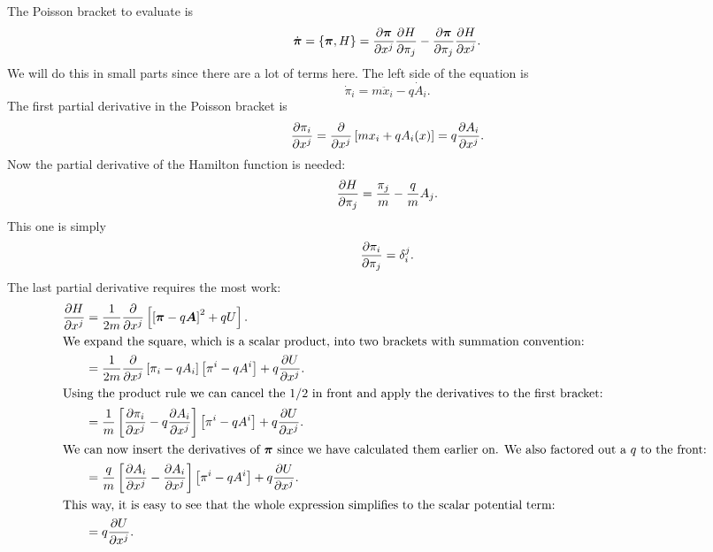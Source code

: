 \documentclass[11pt, english, fleqn, DIV=15, headinclude, BCOR=1cm]{scrartcl}
\begin{document}
The Poisson bracket to evaluate is
\[
    \dot{\boldsymbol{\pi}} = \{\boldsymbol{\pi}, H\} = \frac{\partial {\boldsymbol{\pi}}}{\partial {x^j}} \frac{\partial {H}}{\partial {\pi_j}} -
    \frac{\partial {\boldsymbol{\pi}}}{\partial {\pi_j}} \frac{\partial {H}}{\partial {x^j}}.
\]
We will do this in small parts since there are a lot of terms here. The left
side of the equation is
\[
    \dot \pi_i = m \ddot x_i - q \dot A_i.
\]
The first partial derivative in the Poisson bracket is
\[
    \frac{\partial {\pi_i}}{\partial {x^j}} = \frac{\partial {}}{\partial {x^j}} \left[ m x_i + q A_i(x) \right] = q \frac{\partial {A_i}}{\partial {x^j}}.
\]
Now the partial derivative of the Hamilton function is needed:
\[
    \frac{\partial {H}}{\partial {\pi_j}} = \frac{\pi_j}m - \frac qm A_j.
\]
This one is simply
\[
    \frac{\partial {\pi_i}}{\partial {\pi_j}} = \delta_i^j.
\]
The last partial derivative requires the most work:
\begin{align*}
    \pd{H}{x^j}
    &= \frac{1}{2m} \pd{}{x^j} \sbr{ \sbr{\vec \pi - q \vec A}^2 + q U}. \\
    \intertext{%
        We expand the square, which is a scalar product, into two brackets with
        summation convention:
    }
    &= \frac{1}{2m} \pd{}{x^j} \sbr{\pi_i - q A_i} \sbr{\pi^i - q A^i} + q
    \pd{U}{x^j}. \\
    \intertext{%
        Using the product rule we can cancel the $1/2$ in front and apply the
        derivatives to the first bracket:
    }
    &= \frac{1}{m} \sbr{\pd{\pi_i}{x^j} - q \pd{A_i}{x^j}} \sbr{\pi^i - q A^i} + q
    \pd{U}{x^j}. \\
    \intertext{%
        We can now insert the derivatives of $\vec \pi$ since we have
        calculated them earlier on. We also factored out a $q$ to the front:
    }
    &= \frac{q}{m} \sbr{\pd{A_i}{x^j} - \pd{A_i}{x^j}} \sbr{\pi^i - q A^i} + q
    \pd{U}{x^j}. \\
    \intertext{%
        This way, it is easy to see that the whole expression simplifies to the
        scalar potential term:
    }
    &= q \pd{U}{x^j}.
\end{align*}
\end{document}
